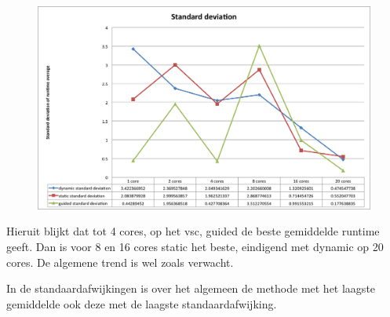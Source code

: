 \documentclass[a4paper,11pt]{article}
\begin{document}
\begin{figure}[h!]
    \centering
    \includegraphics[width=\textwidth]{stdev}
\end{figure}

Hieruit blijkt dat tot 4 cores, op het vsc, guided de beste gemiddelde runtime
geeft. Dan is voor 8 en 16 cores static het beste, eindigend met dynamic op
20 cores. De algemene trend is wel zoals verwacht.

In de standaardafwijkingen is over het algemeen de methode met het laagste
gemiddelde ook deze met de laagste standaardafwijking.
\end{document}
